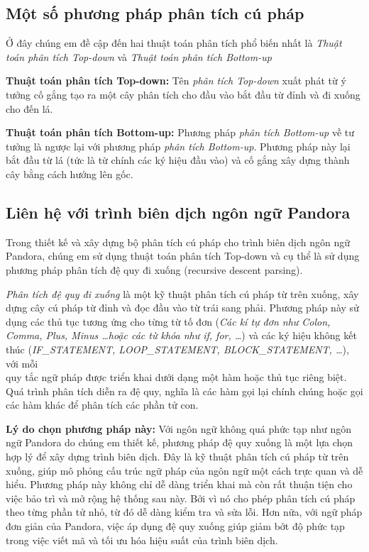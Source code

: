 \subsection{Một số phương pháp phân tích cú pháp}
Ở đây chúng em đề cập đến hai thuật toán phân tích phổ biến nhất là \textit{Thuật toán phân tích Top-down} và \textit{Thuật toán phân tích Bottom-up}

\textbf{Thuật toán phân tích Top-down:}
Tên \textit{phân tích Top-down} xuất phát từ ý tưởng cố gắng tạo ra một cây phân tích cho đầu vào bắt đầu từ đỉnh và đi xuống cho đến lá.

\textbf{Thuật toán phân tích Bottom-up:}
Phương pháp \textit{phân tích Bottom-up} về tư tưởng là ngược lại với phương pháp \textit{phân tích Bottom-up}. Phương pháp này lại bắt đầu từ lá (tức là từ chính các ký hiệu đầu vào) và cố gắng xây dựng thành cây bằng cách hướng lên gốc.

\subsection{Liên hệ với trình biên dịch ngôn ngữ Pandora}
Trong thiết kế và xây dựng bộ phân tích cú pháp cho trình biên dịch ngôn ngữ Pandora, chúng em sử dụng thuật toán phân tích Top-down và cụ thể là sử dụng phương pháp phân tích đệ quy đi xuống (recursive descent parsing).

\textit{Phân tích đệ quy đi xuống} là một kỹ thuật phân tích cú pháp từ trên xuống, xây dựng cây cú pháp từ đỉnh và đọc đầu vào từ trái sang phải. Phương pháp này sử dụng các thủ tục tương ứng cho từng từ tố đơn (\textit{\emph{Các kí tự đơn như} Colon, Comma, Plus, Minus \dots \emph{hoặc các từ khóa như} if, for, \dots }) và các ký hiệu không kết thúc (\textit{IF\_STATEMENT, LOOP\_STATEMENT, BLOCK\_STATEMENT, \dots}), với mỗi \\quy tắc ngữ pháp được triển khai dưới dạng một hàm hoặc thủ tục riêng biệt. Quá trình phân tích diễn ra đệ quy, nghĩa là các hàm gọi lại chính chúng hoặc gọi các hàm khác để phân tích các phần tử con.

\textbf{Lý do chọn phương pháp này:} Với ngôn ngữ không quá phức tạp như ngôn ngữ Pandora do chúng em thiết kế, phương pháp đệ quy xuống là một lựa chọn hợp lý để xây dựng trình biên dịch. Đây là kỹ thuật phân tích cú pháp từ trên xuống, giúp mô phỏng cấu trúc ngữ pháp của ngôn ngữ một cách trực quan và dễ hiểu. Phương pháp này không chỉ dễ dàng triển khai mà còn rất thuận tiện cho việc bảo trì và mở rộng hệ thống sau này. Bởi vì nó cho phép phân tích cú pháp theo từng phần tử nhỏ, từ đó dễ dàng kiểm tra và sửa lỗi. Hơn nữa, với ngữ pháp đơn giản của Pandora, việc áp dụng đệ quy xuống giúp giảm bớt độ phức tạp trong việc viết mã và tối ưu hóa hiệu suất của trình biên dịch.